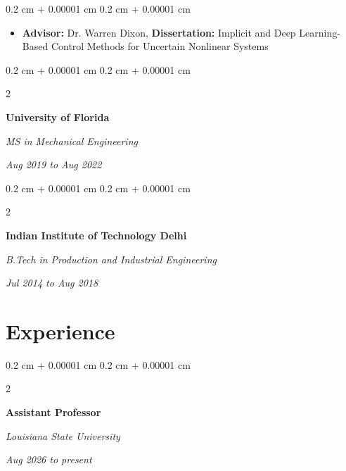 \documentclass[10pt, letterpaper]{article}
\newenvironment{highlights}{
    \begin{itemize}[
        topsep=0.10 cm,
        parsep=0.10 cm,
        partopsep=0pt,
        itemsep=0pt,
        leftmargin=0.4 cm + 10pt
    ]
}{
    \end{itemize}
} %
\newenvironment{onecolentry}{
    \begin{adjustwidth}{
        0.2 cm + 0.00001 cm
    }{
        0.2 cm + 0.00001 cm
    }
}{
    \end{adjustwidth}
} %
\newenvironment{twocolentry}[2][]{
    \onecolentry
    \def\secondColumn{#2}
    \setcolumnwidth{\fill, 4.5 cm}
    \begin{paracol}{2}
}{
    \switchcolumn \raggedleft \secondColumn
    \end{paracol}
    \endonecolentry
} %
\begin{document}
        \vspace{0.05 cm}
        \begin{onecolentry}
            \begin{highlights}
                \setlength{\itemsep}{0pt} %
                \item \textbf{Advisor:} Dr. Warren Dixon, \textbf{Dissertation:} Implicit and Deep Learning-Based Control Methods for Uncertain Nonlinear Systems
            \end{highlights}
        \end{onecolentry}


        \vspace{0.05 cm}

        \begin{twocolentry}{
            
            
        \textit{Aug 2019 to Aug 2022}}
            \textbf{University of Florida}

            \textit{MS in Mechanical Engineering}
        \end{twocolentry}



        \vspace{0.05 cm}

        \begin{twocolentry}{
            
            
        \textit{Jul 2014 to Aug 2018}}
            \textbf{Indian Institute of Technology Delhi}

            \textit{B.Tech in Production and Industrial Engineering}
        \end{twocolentry}




    
    \section{Experience}



        
        \begin{twocolentry}{
            
            
        \textit{Aug 2026 to present}}
            \textbf{Assistant Professor}
            
            \textit{Louisiana State University}
        \end{twocolentry}
\end{document}

